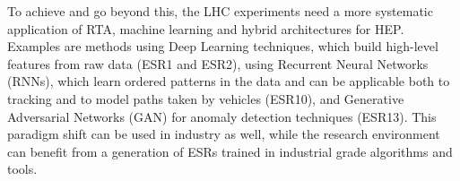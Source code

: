 To achieve and go beyond this, the LHC experiments need a more systematic application of RTA, machine learning and hybrid architectures for HEP. Examples are methods using Deep Learning techniques, which build high-level features from raw data (ESR1 and ESR2), using Recurrent Neural Networks (RNNs), which learn ordered patterns in the data and can be applicable both to tracking and to model paths taken by vehicles (ESR10), and Generative Adversarial Networks (GAN) for anomaly detection techniques (ESR13).
This paradigm shift can be used in industry as well, while the research environment can benefit from a generation of ESRs trained in industrial grade algorithms and tools. 


